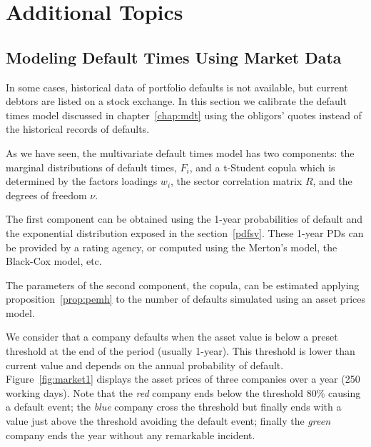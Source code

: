 \documentclass[11pt,fleqn]{book} %
\begin{document}
\chapter{Additional Topics}

\section{Modeling Default Times Using Market Data}

In some cases, historical data of portfolio defaults is not available, but 
current debtors are listed on a stock exchange. In this section we calibrate 
the default times model discussed in chapter~\ref{chap:mdt} using the obligors' 
quotes instead of the historical records of defaults.

As we have seen, the multivariate default times model has two components: the 
marginal distributions of default times, $F_i$, and a t-Student copula which is 
determined by the factors loadings $w_i$, the sector correlation matrix $R$, 
and the degrees of freedom $\nu$.

The first component can be obtained using the 1-year probabilities of default 
and the exponential distribution exposed in the section~\ref{pdfsv}. These 
1-year PDs can be provided by a rating agency, or computed using the Merton's 
model, the Black-Cox model, etc.

The parameters of the second component, the copula, can be estimated applying
proposition~\ref{prop:pemh} to the number of defaults simulated using an asset 
prices model.

We consider that a company defaults when the asset value is below a preset 
threshold at the end of the period (usually 1-year). This threshold is 
lower than current value and depends on the annual probability of default. 
Figure~\ref{fig:market1} displays the asset prices of three companies over a 
year (250 working days). Note that the \emph{red} company ends below the 
threshold $80\%$ causing a default event; the \emph{blue} company cross the 
threshold but finally ends with a value just above the threshold avoiding
the default event; finally the \emph{green} company ends the year without 
any remarkable incident.
\end{document}
